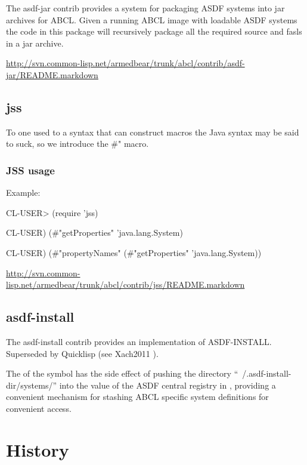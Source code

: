 \documentclass[10pt]{book}
\begin{document}
The asdf-jar contrib provides a system for packaging ASDF systems into
jar archives for ABCL.  Given a running ABCL image with loadable ASDF
systems the code in this package will recursively package all the
required source and fasls in a jar archive.

\url{http://svn.common-lisp.net/armedbear/trunk/abcl/contrib/asdf-jar/README.markdown}


\section{jss}
\label{section:jss}

To one used to a syntax that can construct macros the Java syntax
may be said to suck, so we introduce the  \#" macro.

\subsection{JSS usage}

Example:

\begin{listing-lisp}

CL-USER> (require 'jss)

CL-USER) (#"getProperties" 'java.lang.System)

CL-USER) (#"propertyNames" (#"getProperties" 'java.lang.System))

\end{listing-lisp}

\url{http://svn.common-lisp.net/armedbear/trunk/abcl/contrib/jss/README.markdown}

\section{asdf-install}

The asdf-install contrib provides an implementation of ASDF-INSTALL.
Superseded by Quicklisp (see Xach2011 \cite{Xach2011}).

The  of the  symbol has the side
effect of pushing the directory ``~/.asdf-install-dir/systems/'' into
the value of the \textsc{ASDF} central registry in
, providing a convenient mechanism for
stashing \textsc{ABCL} specific system definitions for convenient
access.

\chapter{History}
\end{document}
